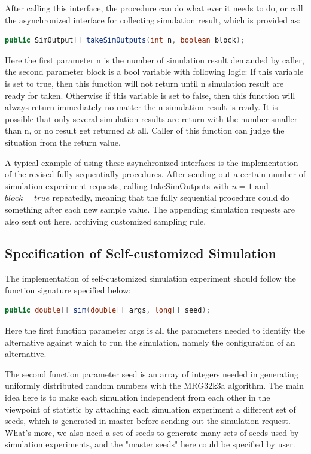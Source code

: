 \documentclass[12pt,a4paper]{report}
\begin{document}
After calling this interface, the procedure can do what ever it needs to do, or call the asynchronized interface for collecting simulation result, which is provided as:

\begin{lstlisting}[language=Java]
public SimOutput[] takeSimOutputs(int n, boolean block);
\end{lstlisting}

Here the first parameter n is the number of simulation result demanded by caller, the second parameter block is a bool variable with following logic: If this variable is set to true, then this function will not return until n simulation result are ready for taken. Otherwise if this variable  is set to false, then this function will always return immediately no matter the n simulation result is ready. It is possible that only several simulation results are return with the number smaller than n, or no result get returned at all. Caller of this function can judge the situation from the return value.

A typical example of using these asynchronized interfaces is the implementation of the revised fully sequentially procedures. After sending out a certain number of simulation experiment requests, calling takeSimOutputs with $n = 1$ and $block = true$ repeatedly, meaning that the fully sequential procedure could do something after each new sample value. The appending simulation requests are also sent out here, archiving customized sampling rule.

\subsection{Specification of Self-customized Simulation}

The implementation of self-customized simulation experiment should follow the function signature specified below:

\begin{lstlisting}[language=Java]
public double[] sim(double[] args, long[] seed);
\end{lstlisting}

Here the first function parameter args is all the parameters needed to identify the alternative against which to run the simulation, namely the configuration of an alternative.

The second function parameter seed is an array of integers needed in generating uniformly distributed random numbers with the MRG32k3a algorithm. The main idea here is to make each simulation independent from each other in the viewpoint of statistic by attaching each simulation experiment a different set of seeds, which is generated in master before sending out the simulation request. What's more, we also need a set of seeds to generate many sets of seeds used by simulation experiments, and the "master seeds" here could be specified by user.
\end{document}

